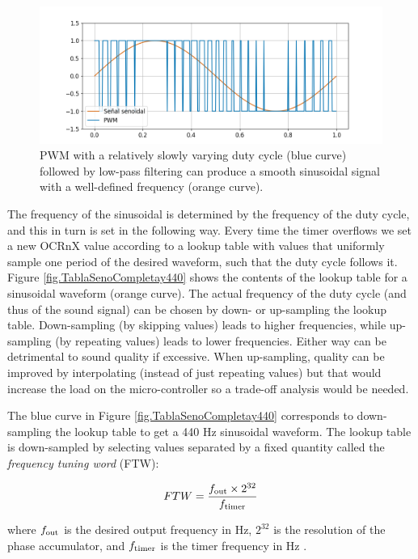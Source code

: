 \documentclass[twocolumn]{article}
\begin{document}
\begin{figure}[ht]
    \centering
    \includegraphics[width=\linewidth]{figures/EsquemaPWM.png}
    \caption{PWM with a relatively slowly varying duty cycle (blue curve) followed by low-pass filtering can produce a smooth sinusoidal signal with a well-defined frequency (orange curve).}
    \label{fig.PWMsine}
\end{figure}


The frequency of the sinusoidal is determined by the frequency of the duty cycle, and this in turn is set in the following way. Every time the timer overflows we set a new OCRnX value according to a lookup table with values that uniformly sample one period of the desired waveform, such that the duty cycle follows it. Figure \ref{fig.TablaSenoCompletay440} shows the contents of the lookup table for a sinusoidal waveform (orange curve). The actual frequency of the duty cycle (and thus of the sound signal) can be chosen by down- or up-sampling the lookup table. Down-sampling (by skipping values) leads to higher frequencies, while up-sampling (by repeating values) leads to lower frequencies. Either way can be detrimental to sound quality if excessive. When up-sampling, quality can be improved by interpolating (instead of just repeating values) but that would increase the load on the micro-controller so a trade-off analysis would be needed.

The blue curve in Figure \ref{fig.TablaSenoCompletay440} corresponds to down-sampling the lookup table to get a 440 Hz sinusoidal waveform. The lookup table is down-sampled by selecting values separated by a fixed quantity called the {\em frequency tuning word} (FTW):

\begin{equation}
    FTW = \frac{f_{\mbox{\scriptsize out}} \times 2^{32}}{f_{\mbox{\scriptsize timer}}}
\end{equation}

\noindent where $f_{\mbox{\scriptsize out}}$ is the desired output frequency in Hz, $2^{32}$ is the resolution of the phase accumulator, and $f_{\mbox{\scriptsize timer}}$ is the timer frequency in Hz \cite{ftw}.
\end{document}

